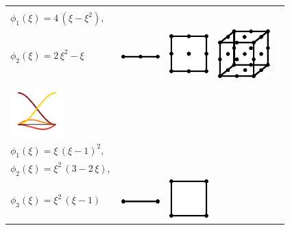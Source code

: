 \begin{table}
\begin{tabular}{|ll|lll|}
      \begin{minipage}{5cm}
        \vspace{-15mm}
        $\phi_0(\xi) = (2\,\xi - 1) \,(\xi-1), $ \\[2mm]
        $\phi_1(\xi) = 4\,(\xi - \xi^2),$    \\[2mm] 
        $\phi_2(\xi) = 2\,\xi^2 - \xi$
      \end{minipage}
       &
      \includegraphics[width=15mm]{images/implementation/ansatz_mesh_4.pdf} & 
      \includegraphics[width=15mm]{images/implementation/ansatz_mesh_5.pdf} &
      \includegraphics[width=2cm]{images/implementation/ansatz_mesh_6.pdf} \vspace{2mm}\\
    \hline
      \includegraphics[width=2cm]{images/implementation/ansatz3.pdf}&
      \begin{minipage}{5cm}
        \vspace{-1cm}
        $\phi_0(\xi) = 2\,\xi^3- 3\,\xi^2 + 1, $\\[2mm]
        $\phi_1(\xi) = \xi\,(\xi-1)^2,         $\\[2mm]
        $\phi_2(\xi) = \xi^2 \, (3 - 2\,\xi),  $\\[2mm]
        $\phi_3(\xi) = \xi^2 \, (\xi-1)  $
      \end{minipage}
       &
      \includegraphics[width=15mm]{images/implementation/ansatz_mesh_1.pdf} & 
      \includegraphics[width=15mm]{images/implementation/ansatz_mesh_2.pdf} &

\end{tabular}
\end{table}
